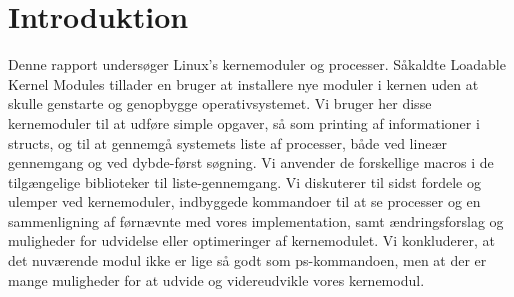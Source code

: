 \chapter{Introduktion}
Denne rapport undersøger Linux's kernemoduler og processer. Såkaldte Loadable Kernel Modules tillader en bruger at installere nye moduler i kernen uden at skulle genstarte og genopbygge operativsystemet. Vi bruger her disse kernemoduler til at udføre simple opgaver, så som printing af informationer i structs, og til at gennemgå systemets liste af processer, både ved lineær gennemgang og ved dybde-først søgning. Vi anvender de forskellige macros i de tilgængelige biblioteker til liste-gennemgang. Vi diskuterer til sidst fordele og ulemper ved kernemoduler, indbyggede kommandoer til at se processer og en sammenligning af førnævnte med vores implementation, samt ændringsforslag og muligheder for udvidelse eller optimeringer af kernemodulet. Vi konkluderer, at det nuværende modul ikke er lige så godt som ps-kommandoen, men at der er mange muligheder for at udvide og videreudvikle vores kernemodul. 
